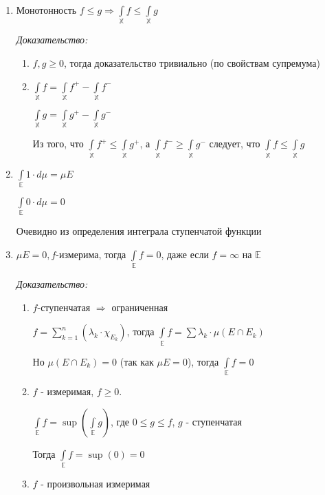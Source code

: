 \documentclass[paper=a4, fontsize=13.2pt]{article}
\begin{document}
\begin{enumerate}
	\item Монотонность
	$f \leqslant g \Rightarrow \int\limits_{\mathds{X}} f \leqslant \int\limits_{\mathds{X}} g$

	\emph{Доказательство:}
	\begin{enumerate}
		\item $f, g \geqslant 0$, тогда доказательство тривиально (по свойствам супремума)
		\item $\int\limits_{\mathds{X}} f = \int\limits_{\mathds{X}} f^+ - \int\limits_{\mathds{X}} f^-$

		$\int\limits_{\mathds{X}} g = \int\limits_{\mathds{X}} g^+ - \int\limits_{\mathds{X}} g^-$

		Из того, что $\int\limits_{\mathds{X}} f^+ \leqslant \int\limits_{\mathds{X}} g^+$, а $\int\limits_{\mathds{X}} f^- \geqslant \int\limits_{\mathds{X}} g^-$ следует, что $\int\limits_{\mathds{X}} f \leqslant \int\limits_{\mathds{X}} g$
	\end{enumerate}

	\item
	$\int\limits_{\mathds{E}} 1 \cdot d \mu = \mu E$

	$\int\limits_{\mathds{E}} 0 \cdot d \mu = 0$

	Очевидно из определения интеграла ступенчатой функции

	\item $\mu E = 0, f $-измерима, тогда $\int\limits_{\mathds{E}}f = 0$, даже если $f = \infty$ на $\mathds{E}$

	\emph{Доказательство:}

	\begin{enumerate}
		\item $f $-ступенчатая $\Rightarrow$ ограниченная

		$f = \sum\limits_{k = 1}^{n}(\lambda_k \cdot \chi_{E_k})$, тогда $\int\limits_\mathds{E} f = \sum \lambda_k \cdot \mu (E \cap E_k)$

		Но $\mu (E \cap E_k) = 0$ (так как $\mu E = 0$), тогда $\int\limits_\mathds{E} f = 0$

		\item $f$ - измеримая, $f \geqslant 0$.

		$\int\limits_\mathds{E} f = \sup (\int\limits_\mathds{E} g)$, где $0 \leqslant g \leqslant f$, $g$ - ступенчатая

		Тогда $\int\limits_\mathds{E} f = \sup (0) = 0$

		\item
		$f$ - произвольная измеримая


\end{enumerate}
\end{enumerate}
\end{document}
